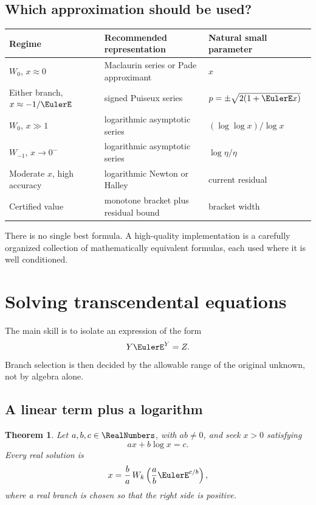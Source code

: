\documentclass[11pt]{article}
\newtheorem{theorem}{Theorem}[section]
\theoremstyle{remark}
\begin{document}
\subsection{Which approximation should be used?}

\begin{center}
\begin{tabularx}{.96\textwidth}{@{}lXl@{}}
\toprule
Regime & Recommended representation & Natural small parameter\\
\midrule
\(W_0\), \(x\approx0\) &
Maclaurin series or Pade approximant & \(x\)\\
Either branch, \(x\approx-1/\EulerE\) &
signed Puiseux series & \(p=\pm\sqrt{2(1+\EulerE x)}\)\\
\(W_0\), \(x\gg1\) &
logarithmic asymptotic series & \((\log\log x)/\log x\)\\
\(W_{-1}\), \(x\to0^-\) &
logarithmic asymptotic series & \(\log\eta/\eta\)\\
Moderate \(x\), high accuracy &
logarithmic Newton or Halley & current residual\\
Certified value &
monotone bracket plus residual bound & bracket width\\
\bottomrule
\end{tabularx}
\end{center}

There is no single best formula.  A high-quality implementation is a
carefully organized collection of mathematically equivalent formulas, each
used where it is well conditioned.


\section{Solving transcendental equations}\label{sec:equations}

The main skill is to isolate an expression of the form
\[
       Y\EulerE^Y=Z.
\]
Branch selection is then decided by the allowable range of the original
unknown, not by algebra alone.

\subsection{A linear term plus a logarithm}

\begin{theorem}\label{thm:axblogx}
Let \(a,b,c\in\RealNumbers\), with \(ab\neq0\), and seek \(x>0\) satisfying
\[
       ax+b\log x=c.
\]
Every real solution is
\begin{equation}\label{eq:axblogx}
       x=\frac ba\,
       W_k\left(\frac ab\EulerE^{c/b}\right),
\end{equation}
where a real branch is chosen so that the right side is positive.
\end{theorem}
\end{document}
